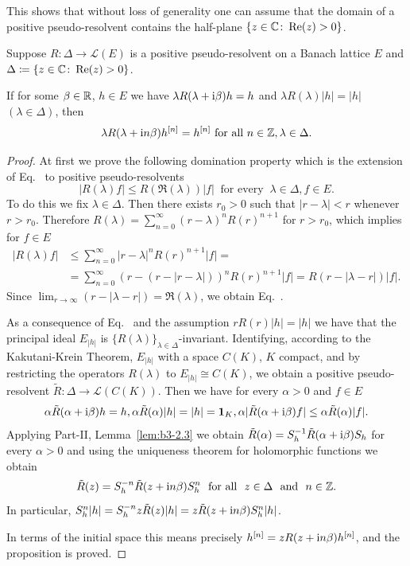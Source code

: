 This shows that without loss of generality one can assume that the domain of a positive pseudo-resolvent contains the half-plane $\{z \in \mathbb{C}  \colon \mathop{}\!\mathrm{Re}(z) > 0\}$.
\begin{proposition}\label{prop:c3-2.7}
	Suppose $R \colon \Delta \to \mathcal{L}(E)$ is a positive pseudo-resolvent on a Banach lattice $E$ and $\Delta \coloneq \{z \in \mathbb{C}  \colon \mathop{}\!\mathrm{Re}(z) > 0\}$.
	
	If for some $\beta \in \mathbb{R} $, $h \in E$ we have
	$\lambda R(\lambda+\mathrm{i}\beta)h = h$ and $\lambda R(\lambda)|h| = |h|$ $(\lambda \in \Delta)$, then
	\[
    \lambda R(\lambda+\mathrm{i} n\beta)h^{[n]} = h^{[n]} \text{ for all } n \in \mathbb{Z}, \lambda \in \Delta .
    \]
\end{proposition}
\begin{proof}
At first we prove the following domination property which is the extension of Eq.~ to positive pseudo-resolvents
\begin{equation}\label{eq:c3-2.13}
	|R(\lambda)f| \leq R(\Re(\lambda)) |f| \ \text{ for every } \ \lambda \in \Delta , f \in E .
\end{equation}
To do this we fix $\lambda \in \Delta$.
Then there exists $r_{0} > 0$ such that $|r-\lambda| < r$ whenever $r > r_{0}$.
Therefore $R(\lambda) = \sum_{n=0}^{\infty}(r-\lambda)^{n}R(r)^{n+1}$ for $r > r_{0}$, which implies for $f \in E$
\begin{align*}
	|R(\lambda)f| &\leq \sum_{n=0}^{\infty}|r-\lambda|^{n}R(r)^{n+1}|f| = \\
	& =\sum_{n=0}^{\infty}(r - (r-|r-\lambda|))^{n}R(r)^{n+1}|f| = R(r - |\lambda-r|) |f| .
\end{align*}
Since $\lim_{r \to \infty} (r - |\lambda-r|) = \Re(\lambda)$, we obtain Eq.~.

As a consequence of Eq.~ and the assumption $rR(r) |h| = |h|$ we have that the principal ideal $E_{|h|}$ is $\{R(\lambda)\}_{\lambda \in \Delta}$-invariant.
Identifying, according to the Kakutani-Krein Theorem, $E_{|h|}$ with a space $C(K)$, $K$ compact, and by restricting the operators $R(\lambda)$ to $E_{|h|} \cong C(K)$, we obtain a positive pseudo-resolvent $\tilde{R} \colon \Delta \to \mathcal{L}(C(K))$.
Then we have for every $\alpha > 0$ and $f \in E$
\[
\alpha\tilde{R}(\alpha+\im\beta)h = h, \alpha\tilde{R}(\alpha) |h| = |h| = \1_{K}, \alpha|\tilde{R}(\alpha+\im\beta)f| \leq \alpha\tilde{R}(\alpha) |f| .
\]
Applying Part-II, Lemma~\ref{lem:b3-2.3} we obtain $\tilde{R}(\alpha) = S_{h}^{-1}\tilde{R}(\alpha + \mathrm{i}\beta)S_{h}$ for every $\alpha > 0$ and using the uniqueness theorem for holomorphic functions we obtain
\begin{equation}\label{eq:c3-2.14}
\tilde{R}(z) = S_{h}^{-n}\tilde{R}(z + \mathrm{i} n\beta)S_{h}^{n} \ \text{ for all } \ z \in \Delta \ \text{ and } \ n \in \mathbb{Z} .
\end{equation}
In particular, $S_{h}^{n}|h| = S_{h}^{-n}z\tilde{R}(z) |h| = z\tilde{R}(z+\mathrm{i} n\beta)S_{h}^{n}|h|$.

In terms of the initial space this means precisely $h^{[n]} = zR(z+\mathrm{i} n\beta)h^{[n]}$, and the proposition is proved.
\end{proof}
